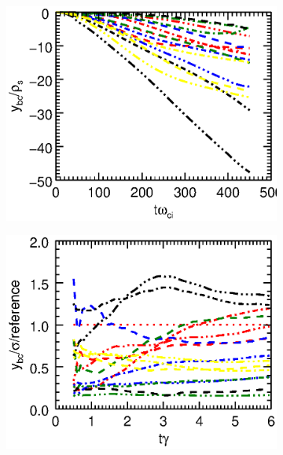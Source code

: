 \documentclass[9pt,twocolumn]{article}
\renewcommand{\=}[1]{\stackrel{#1}{=}} %
\theoremstyle{definition}
\theoremstyle{remark}
\begin{document}
\begin{figure}
\begin{subfigure}{.4\textwidth}
	\includegraphics[trim={115mm 88mm 1mm 7mm},clip,width=1\linewidth]{Pictures/posygrpewiitgt.eps}
\end{subfigure}
\begin{subfigure}{.4\textwidth}
	\centering
	\includegraphics[trim={115mm 88mm 1mm 7mm},clip,width=1\linewidth]{Pictures/ynormgrpewiitgt.eps}
\end{subfigure}
\label{scaling}
\end{figure}
\end{document}
